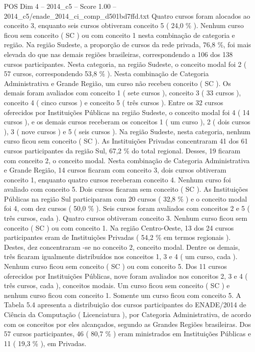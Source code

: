 \begin{textsample}{POS Dim 4 – 2014\_c5 – Score 1.00 – 2014\_c5/enade\_2014\_ci\_comp\_d501bd7ffd.txt}
Quatro cursos foram alocados ao conceito 3, enquanto seis cursos obtiveram conceito 5 ( 24,0 \% ).
Nenhum curso ficou sem conceito ( SC ) ou com conceito 1 nesta combinação de categoria e região.
Na região Sudeste, a proporção de cursos da rede privada, 76,8 \%, foi mais elevada do que nas demais regiões brasileiras, correspondendo a 106 dos 138 cursos participantes.
Nesta categoria, na região Sudeste, o conceito modal foi 2 ( 57 cursos, correspondendo 53,8 \% ).
Nesta combinação de Categoria Administrativa e Grande Região, um curso não recebeu conceito ( SC ).
Os demais foram avaliados com conceito 1 ( sete cursos ), conceito 3 ( 33 cursos ), conceito 4 ( cinco cursos ) e conceito 5 ( três cursos ).
Entre os 32 cursos oferecidos por Instituições Públicas na região Sudeste, o conceito modal foi 4 ( 14 cursos ), e os demais cursos receberam os conceitos 1 ( um curso ), 2 ( dois cursos ), 3 ( nove cursos ) e 5 ( seis cursos ).
Na região Sudeste, nesta categoria, nenhum curso ficou sem conceito ( SC ).
As Instituições Privadas concentraram 41 dos 61 cursos participantes da região Sul, 67,2 \% do total regional.
Desses, 19 ficaram com conceito 2, o conceito modal.
Nesta combinação de Categoria Administrativa e Grande Região, 14 cursos ficaram com conceito 3, dois cursos obtiveram conceito 1, enquanto quatro cursos receberam conceito 4.
Nenhum curso foi avaliado com conceito 5.
Dois cursos ficaram sem conceito ( SC ).
As Instituições Públicas na região Sul participaram com 20 cursos ( 32,8 \% ) e o conceito modal foi 4, com dez cursos ( 50,0 \% ).
Seis cursos foram avaliados com conceitos 2 e 5 ( três cursos, cada ).
Quatro cursos obtiveram conceito 3.
Nenhum curso ficou sem conceito ( SC ) ou com conceito 1.
Na região Centro-Oeste, 13 dos 24 cursos participantes eram de Instituições Privadas ( 54,2 \% em termos regionais ).
Destes, dez concentraram -se no conceito 2, conceito modal.
Dentre os demais, três ficaram igualmente distribuídos nos conceitos 1, 3 e 4 ( um curso, cada ).
Nenhum curso ficou sem conceito ( SC ) ou com conceito 5.
Dos 11 cursos oferecidos por Instituições Públicas, nove foram avaliados nos conceitos 2, 3 e 4 ( três cursos, cada ), conceitos modais.
Um curso ficou sem conceito ( SC ) e nenhum curso ficou com conceito 1.
Somente um curso ficou com conceito 5.
A Tabela 5.4 apresenta a distribuição dos cursos participantes do ENADE/2014 de Ciência da Computação ( Licenciatura ), por Categoria Administrativa, de acordo com os conceitos por eles alcançados, segundo as Grandes Regiões brasileiras.
Dos 57 cursos participantes, 46 ( 80,7 \% ) eram ministrados em Instituições Públicas e 11 ( 19,3 \% ), em Privadas.

\end{textsample}
